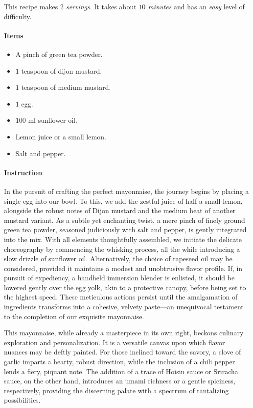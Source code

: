 This recipe makes \emph{$2$ servings}. It takes about \emph{$10$ minutes} and has an \emph{easy} level of difficulty.

\paragraph{Items}
\begin{itemize}[noitemsep]
    \item[\ding{182}] A pinch of green tea powder.
    \item[\ding{183}] $1$ teaspoon of dijon mustard.
    \item[\ding{184}] $1$ teaspoon of medium mustard.
    \item[\ding{185}] $1$ egg.
    \item[\ding{186}] $100$ ml sunflower oil.
    \item[\ding{187}] Lemon juice or a small lemon.
    \item[\ding{188}] Salt and pepper.
    
\end{itemize}

\paragraph{Instruction}
In the pursuit of crafting the perfect mayonnaise, the journey begins by placing a single egg into our bowl. To this, we add the zestful juice of half a small lemon, alongside the robust notes of Dijon mustard and the medium heat of another mustard variant. As a subtle yet enchanting twist, a mere pinch of finely ground green tea powder, seasoned judiciously with salt and pepper, is gently integrated into the mix. With all elements thoughtfully assembled, we initiate the delicate choreography by commencing the whisking process, all the while introducing a slow drizzle of sunflower oil. Alternatively, the choice of rapeseed oil may be considered, provided it maintains a modest and unobtrusive flavor profile. If, in pursuit of expediency, a handheld immersion blender is enlisted, it should be lowered gently over the egg yolk, akin to a protective canopy, before being set to the highest speed. These meticulous actions persist until the amalgamation of ingredients transforms into a cohesive, velvety paste—an unequivocal testament to the completion of our exquisite mayonnaise.

This mayonnaise, while already a masterpiece in its own right, beckons culinary exploration and personalization. It is a versatile canvas upon which flavor nuances may be deftly painted. For those inclined toward the savory, a clove of garlic imparts a hearty, robust direction, while the inclusion of a chili pepper lends a fiery, piquant note. The addition of a trace of Hoisin sauce or Sriracha sauce, on the other hand, introduces an umami richness or a gentle spiciness, respectively, providing the discerning palate with a spectrum of tantalizing possibilities.
\clearpage


